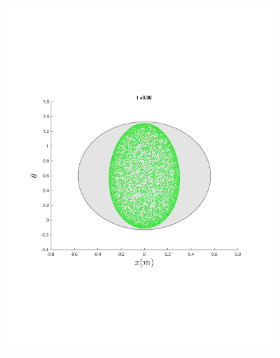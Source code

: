 \begin{figure}
{\begin{subfigure}{0.5\textwidth}
\begin{subfigure}[b]{0.5\textwidth}
        \includegraphics[trim={1cm 7cm 1cm 7cm},
        width=\textwidth]{figures/method/FunnelSimOverlaid9funnel-1y-theta}
      \end{subfigure}%
      \\
      \begin{subfigure}[b]{0.5\textwidth}

\end{subfigure}
\end{subfigure}}
\end{figure}
